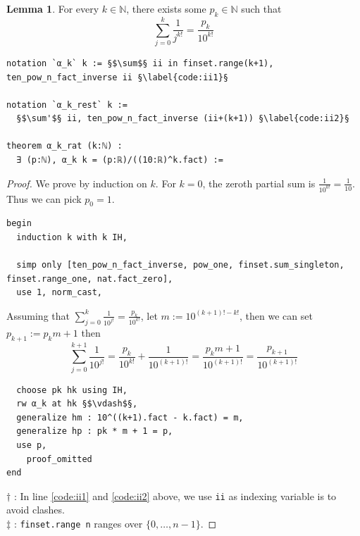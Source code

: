 \documentclass{report}
\theoremstyle{definition}
\newtheorem{lemma}{Lemma}[section]
\begin{document}
\begin{lemma}\label{lemma:partialSum}
For every $k\in\mathbb N$, there exists some $p_k\in\mathbb N$ such that
$$
\sum_{j=0}^k\frac1{j^{k!}}=\frac{p_k}{10^{k!}}
$$
\begin{verbatim}
notation `α_k` k := §$\sum$§ ii in finset.range(k+1), ten_pow_n_fact_inverse ii §\label{code:ii1}§

notation `α_k_rest` k := 
  §$\sum'$§ ii, ten_pow_n_fact_inverse (ii+(k+1)) §\label{code:ii2}§

theorem α_k_rat (k:ℕ) : 
  ∃ (p:ℕ), α_k k = (p:ℝ)/((10:ℝ)^k.fact) :=
\end{verbatim}
\end{lemma}

\begin{proof}
We prove by induction on $k$. For $k=0$, the zeroth partial sum is $\frac1{10^{0!}}=\frac1{10}$. Thus we can pick $p_0=1$.

\begin{verbatim}
begin
  induction k with k IH,

  simp only [ten_pow_n_fact_inverse, pow_one, finset.sum_singleton, finset.range_one, nat.fact_zero], 
  use 1, norm_cast, 
\end{verbatim}

Assuming that $\sum_{j=0}^k\frac1{10^{j!}}=\frac{p_k}{10^{k!}}$, let $m:=10^{(k+1)!-k!}$, then we can set $p_{k+1}:=p_k m+1$ then
$$
\sum_{j=0}^{k+1}\frac1{10^{j!}}=\frac{p_k}{10^{k!}}+\frac1{10^{(k+1)!}}=\frac{p_km+1}{10^{(k+1)!}}=\frac{p_{k+1}}{10^{(k+1)!}}
$$
\begin{verbatim}                                                                            
  choose pk hk using IH,
  rw α_k at hk §$\vdash$§,
  generalize hm : 10^((k+1).fact - k.fact) = m,
  generalize hp : pk * m + 1 = p,
  use p,
    proof_omitted
end
\end{verbatim}
$\dagger$ : In line \ref{code:ii1} and \ref{code:ii2} above, we use {\tt \small ii} as indexing variable is to avoid clashes.\\
$\ddagger$ : {\tt finset.range n} ranges over $\{0,\dots,n-1\}$.
\end{proof}
\end{document}
